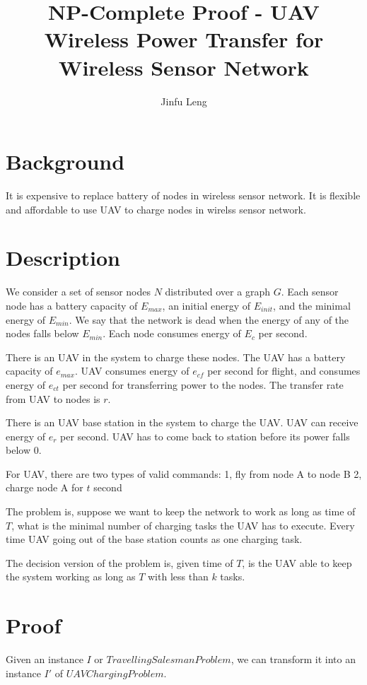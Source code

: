 
\title{NP-Complete Proof - UAV Wireless Power Transfer for Wireless Sensor Network}
\author{Jinfu Leng}
\maketitle
\section{Background}
It is expensive to replace battery of nodes in wireless sensor network.
It is flexible and affordable to use UAV to charge nodes in wirelss sensor network.
\section{Description}
We consider a set of sensor nodes $N$ distributed over a graph $G$. Each sensor node has a battery capacity of $E_{max}$, an initial energy of $E_{init}$, and the minimal energy of $E_{min}$. We say that the network is dead when the energy of any of the nodes falls below $E_{min}$. Each node consumes energy of $E_{c}$ per second.

There is an UAV in the system to charge these nodes. The UAV has a battery capacity of $e_{max}$. UAV consumes energy of $e_{cf}$ per second for flight, and consumes energy of $e_{ct}$ per second for transferring power to the nodes. The transfer rate from UAV to nodes is $r$.

There is an UAV base station in the system to charge the UAV. UAV can receive energy of $e_r$ per second. UAV has to come back to station before its power falls below $0$.

For UAV, there are two types of valid commands:
1, fly from node A to node B
2, charge node A for $t$ second

The problem is, suppose we want to keep the network to work as long as time of $T$, what is the minimal number of charging tasks the UAV has to execute. Every time UAV going out of the base station counts as one charging task.

The decision version of the problem is, given time of $T$, is the UAV able to keep the system working as long as $T$ with less than $k$ tasks.
\section{Proof}
Given an instance $I$ or $Travelling Salesman Problem$, we can transform it into an instance $I'$ of $UAV Charging Problem$.

